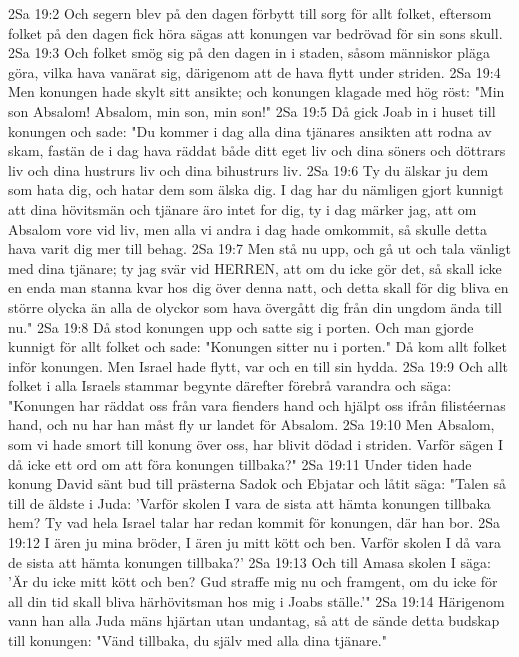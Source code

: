 2Sa 19:2  Och segern blev på den dagen förbytt till sorg för allt folket, eftersom folket på den dagen fick höra sägas att konungen var bedrövad för sin sons skull.
2Sa 19:3  Och folket smög sig på den dagen in i staden, såsom människor pläga göra, vilka hava vanärat sig, därigenom att de hava flytt under striden.
2Sa 19:4  Men konungen hade skylt sitt ansikte; och konungen klagade med hög röst: "Min son Absalom! Absalom, min son, min son!"
2Sa 19:5  Då gick Joab in i huset till konungen och sade: "Du kommer i dag alla dina tjänares ansikten att rodna av skam, fastän de i dag hava räddat både ditt eget liv och dina söners och döttrars liv och dina hustrurs liv och dina bihustrurs liv.
2Sa 19:6  Ty du älskar ju dem som hata dig, och hatar dem som älska dig. I dag har du nämligen gjort kunnigt att dina hövitsmän och tjänare äro intet for dig, ty i dag märker jag, att om Absalom vore vid liv, men alla vi andra i dag hade omkommit, så skulle detta hava varit dig mer till behag.
2Sa 19:7  Men stå nu upp, och gå ut och tala vänligt med dina tjänare; ty jag svär vid HERREN, att om du icke gör det, så skall icke en enda man stanna kvar hos dig över denna natt, och detta skall för dig bliva en större olycka än alla de olyckor som hava övergått dig från din ungdom ända till nu."
2Sa 19:8  Då stod konungen upp och satte sig i porten. Och man gjorde kunnigt för allt folket och sade: "Konungen sitter nu i porten." Då kom allt folket inför konungen. Men Israel hade flytt, var och en till sin hydda.
2Sa 19:9  Och allt folket i alla Israels stammar begynte därefter förebrå varandra och säga: "Konungen har räddat oss från vara fienders hand och hjälpt oss ifrån filistéernas hand, och nu har han måst fly ur landet för Absalom.
2Sa 19:10  Men Absalom, som vi hade smort till konung över oss, har blivit dödad i striden. Varför sägen I då icke ett ord om att föra konungen tillbaka?"
2Sa 19:11  Under tiden hade konung David sänt bud till prästerna Sadok och Ebjatar och låtit säga: "Talen så till de äldste i Juda: 'Varför skolen I vara de sista att hämta konungen tillbaka hem? Ty vad hela Israel talar har redan kommit för konungen, där han bor.
2Sa 19:12  I ären ju mina bröder, I ären ju mitt kött och ben. Varför skolen I då vara de sista att hämta konungen tillbaka?'
2Sa 19:13  Och till Amasa skolen I säga: 'Är du icke mitt kött och ben? Gud straffe mig nu och framgent, om du icke för all din tid skall bliva härhövitsman hos mig i Joabs ställe.'"
2Sa 19:14  Härigenom vann han alla Juda mäns hjärtan utan undantag, så att de sände detta budskap till konungen: "Vänd tillbaka, du själv med alla dina tjänare."
